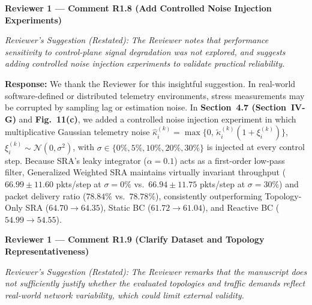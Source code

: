 \documentclass[11pt,a4paper]{article}
\newcommand{\cbox}[2]{%
  \vspace{0.6em}\noindent\textbf{#1}\par\smallskip
  \noindent\textit{Reviewer's Suggestion (Restated):} \textit{#2}\par\smallskip
}
\begin{document}
\hrulefill

\cbox{Reviewer 1 --- Comment R1.8 (Add Controlled Noise Injection Experiments)}{The Reviewer notes that performance sensitivity to control-plane signal degradation was not explored, and suggests adding controlled noise injection experiments to validate practical reliability.}

\noindent\textbf{Response:} We thank the Reviewer for this insightful suggestion. In real-world software-defined or distributed telemetry environments, stress measurements may be corrupted by sampling lag or estimation noise. In \textbf{Section~4.7 (Section~IV-G)} and \textbf{Fig.~11(c)}, we added a controlled noise injection experiment in which multiplicative Gaussian telemetry noise $\widehat{\kappa}_i^{(k)} = \max\{0,\, \widetilde{\kappa}_i^{(k)}(1 + \xi_i^{(k)})\}$, $\xi_i^{(k)} \sim \mathcal{N}(0, \sigma^2)$, with $\sigma \in \{0\%, 5\%, 10\%, 20\%, 30\%\}$ is injected at every control step. Because SRA's leaky integrator ($\alpha=0.1$) acts as a first-order low-pass filter, Generalized Weighted SRA maintains virtually invariant throughput ($66.99 \pm 11.60$ pkts/step at $\sigma=0\%$ vs.\ $66.94 \pm 11.75$ pkts/step at $\sigma=30\%$) and packet delivery ratio ($78.84\%$ vs.\ $78.78\%$), consistently outperforming Topology-Only SRA ($64.70 \to 64.35$), Static BC ($61.72 \to 61.04$), and Reactive BC ($54.99 \to 54.55$).

\hrulefill

\cbox{Reviewer 1 --- Comment R1.9 (Clarify Dataset and Topology Representativeness)}{The Reviewer remarks that the manuscript does not sufficiently justify whether the evaluated topologies and traffic demands reflect real-world network variability, which could limit external validity.}
\end{document}
